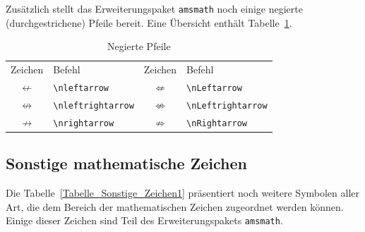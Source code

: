 \documentclass[a4paper,10pt,twoside]{scrbook}
\begin{document}
Zusätzlich stellt das Erweiterungspaket \verb!amsmath! noch einige negierte (durchgestrichene) 
Pfeile bereit. Eine Übersicht enthält Tabelle~\ref{Tabelle_Negierte_Pfeile}.

\begin{table}[h!tb]
\centering
\caption{Negierte Pfeile}
\label{Tabelle_Negierte_Pfeile}       %
\begin{tabular}{clcl}
\hline
Zeichen & Befehl & Zeichen & Befehl \\
$\nleftarrow$ & \texttt{\textbackslash nleftarrow} & 
$\nLeftarrow$ & \texttt{\textbackslash nLeftarrow} \\
$\nleftrightarrow$ & \texttt{\textbackslash nleftrightarrow} &
$\nLeftrightarrow$ & \texttt{\textbackslash nLeftrightarrow} \\
$\nrightarrow$ & \texttt{\textbackslash nrightarrow} &
$\nRightarrow$ & \texttt{\textbackslash nRightarrow} \\
\hline
\end{tabular}
\end{table}


\subsection{Sonstige mathematische Zeichen}

Die Tabelle~\ref{Tabelle_Sonstige_Zeichen1} präsentiert noch weitere
Symbolen aller Art, die dem Bereich der mathematischen Zeichen zugeordnet werden können. Einige dieser Zeichen 
sind Teil des Erweiterungspakets \verb!amsmath!.
\end{document}
